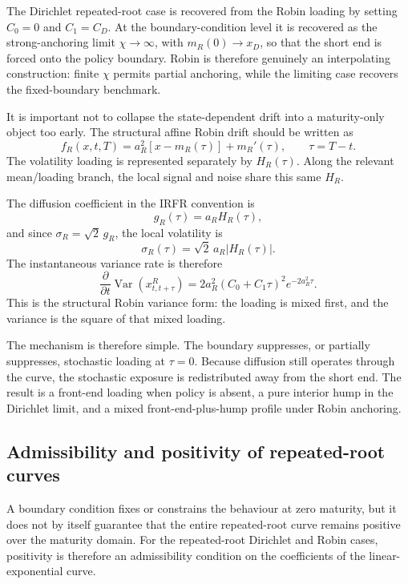 \documentclass[11pt]{article}
\newcommand{\Var}{\operatorname{Var}}
\numberwithin{equation}{section}
\begin{document}
The Dirichlet repeated-root case is recovered from the Robin loading by setting $C_0=0$ and $C_1=C_D$. At the boundary-condition level it is recovered as the strong-anchoring limit $\chi\to\infty$, with $m_R(0)\to x_D$, so that the short end is forced onto the policy boundary. Robin is therefore genuinely an interpolating construction: finite $\chi$ permits partial anchoring, while the limiting case recovers the fixed-boundary benchmark.

It is important not to collapse the state-dependent drift into a maturity-only object too early. The structural affine Robin drift should be written as
\begin{equation}
f_R(x,t,T)=a_R^2\left[x-m_R(\tau)\right]+m_R'(\tau),
\qquad \tau=T-t.
\end{equation}
The volatility loading is represented separately by $H_R(\tau)$. Along the relevant mean/loading branch, the local signal and noise share this same $H_R$.

The diffusion coefficient in the IRFR convention is
\begin{equation}
g_R(\tau)=a_RH_R(\tau),
\end{equation}
and since $\sigma_R=\sqrt{2}\,g_R$, the local volatility is
\begin{equation}
\sigma_R(\tau)=\sqrt{2}\,a_R\left|H_R(\tau)\right|.
\end{equation}
The instantaneous variance rate is therefore
\begin{equation}
\frac{\partial}{\partial t}\Var(x^R_{t,t+\tau})
=
2a_R^2\left(C_0+C_1\tau\right)^2e^{-2a_R^2\tau}.
\end{equation}
This is the structural Robin variance form: the loading is mixed first, and the variance is the square of that mixed loading.

The mechanism is therefore simple. The boundary suppresses, or partially suppresses, stochastic loading at $\tau=0$. Because diffusion still operates through the curve, the stochastic exposure is redistributed away from the short end. The result is a front-end loading when policy is absent, a pure interior hump in the Dirichlet limit, and a mixed front-end-plus-hump profile under Robin anchoring.

\subsection{Admissibility and positivity of repeated-root curves}

A boundary condition fixes or constrains the behaviour at zero maturity, but it does not by itself guarantee that the entire repeated-root curve remains positive over the maturity domain. For the repeated-root Dirichlet and Robin cases, positivity is therefore an admissibility condition on the coefficients of the linear-exponential curve.
\end{document}
